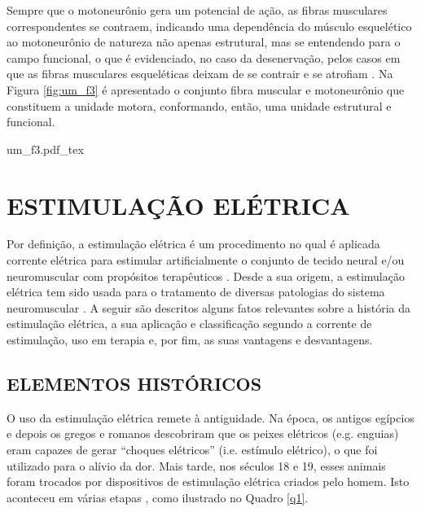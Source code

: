 Sempre que o motoneurônio gera um potencial de ação, as fibras musculares correspondentes se contraem, indicando uma dependência do músculo esquelético ao motoneurônio de natureza não apenas estrutural, mas se entendendo para o campo funcional, o que é evidenciado, no caso da desenervação, pelos casos em que as fibras musculares esqueléticas deixam de se contrair e se atrofiam \cite{JoseLopezChicharro2006FisiologiaEjercicio}. Na Figura \ref{fig:um_f3} é apresentado o conjunto fibra muscular e motoneurônio que constituem a unidade motora, conformando, então, uma unidade estrutural e funcional.

\begin{figure*}[h]
    \centering %
    \small %
    \def\svgwidth{1\columnwidth}%
    {um_f3.pdf_tex}
    \caption{Unidades motoras (adaptado de \cite{JoseLopezChicharro2006FisiologiaEjercicio}).}
    \label{fig:um_f3}
\end{figure*}

\section{ESTIMULAÇÃO ELÉTRICA}

Por definição, a estimulação elétrica é um procedimento no qual é aplicada corrente elétrica para estimular artificialmente o conjunto de tecido neural e/ou neuromuscular com propósitos terapêuticos \cite{Benjamin1978EncyclopediaHealth}. Desde a sua origem, a estimulação elétrica tem sido usada para o tratamento de diversas patologias do sistema neuromuscular \cite{Erick2002EstimulacionUrologia}. A seguir são descritos alguns fatos relevantes sobre a história da estimulação elétrica, a sua aplicação e classificação segundo a corrente de estimulação, uso em terapia e, por fim, as suas vantagens e desvantagens.

\subsection{ELEMENTOS HISTÓRICOS}
O uso da estimulação elétrica remete à antiguidade. Na época, os antigos egípcios e depois os gregos e romanos descobriram que os peixes elétricos (e.g. enguias) eram capazes de gerar “choques elétricos” (i.e. estímulo elétrico), o que foi utilizado para o alívio da dor. Mais tarde, nos séculos 18 e 19, esses animais foram trocados por dispositivos de estimulação elétrica criados pelo homem. Isto aconteceu em várias etapas \cite{Heidland2013NeuromuscularWaisting}, como ilustrado no Quadro \ref{q1}. 

